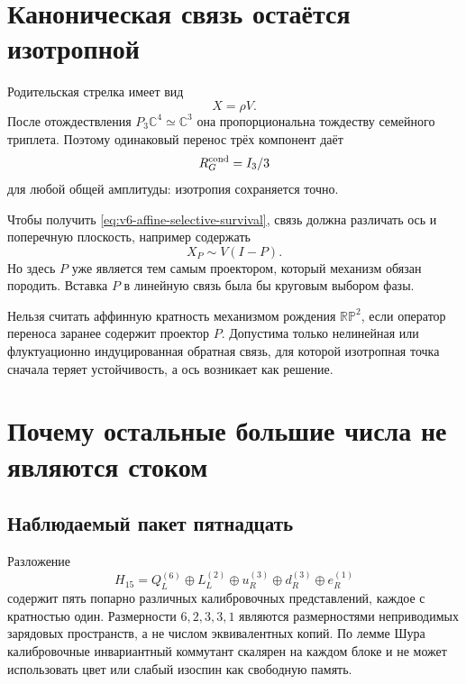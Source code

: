 \section{Каноническая связь остаётся изотропной}

Родительская стрелка имеет вид
\begin{equation}
 X=\rho V.
 \label{eq:v6-affine-canonical-isotropic-link}
\end{equation}
После отождествления $P_3\mathbb C^4\simeq\mathbb C^3$ она пропорциональна
тождеству семейного триплета. Поэтому одинаковый перенос трёх компонент
даёт
\begin{equation}
 R_G^{\rm cond}=I_3/3
\end{equation}
для любой общей амплитуды: изотропия сохраняется точно.

Чтобы получить \eqref{eq:v6-affine-selective-survival}, связь должна
различать ось и поперечную плоскость, например содержать
\begin{equation}
 X_P\sim V(I-P).
 \label{eq:v6-affine-state-selective-link}
\end{equation}
Но здесь $P$ уже является тем самым проектором, который механизм обязан
породить. Вставка $P$ в линейную связь была бы круговым выбором фазы.

\begin{nogocriterion}
Нельзя считать аффинную кратность механизмом рождения $\mathbb{RP}^2$,
если оператор переноса заранее содержит проектор $P$. Допустима только
нелинейная или флуктуационно индуцированная обратная связь, для которой
изотропная точка сначала теряет устойчивость, а ось возникает как решение.
\end{nogocriterion}

\section{Почему остальные большие числа не являются стоком}

\subsection{Наблюдаемый пакет пятнадцать}

Разложение
\begin{equation}
 H_{15}=Q_L^{(6)}\oplus L_L^{(2)}\oplus u_R^{(3)}
 \oplus d_R^{(3)}\oplus e_R^{(1)}
\end{equation}
содержит пять попарно различных калибровочных представлений, каждое с кратностью
один. Размерности $6,2,3,3,1$ являются размерностями неприводимых зарядовых
пространств, а не числом эквивалентных копий. По лемме Шура калибровочные
инвариантный коммутант скалярен на каждом блоке и не может использовать
цвет или слабый изоспин как свободную память.

